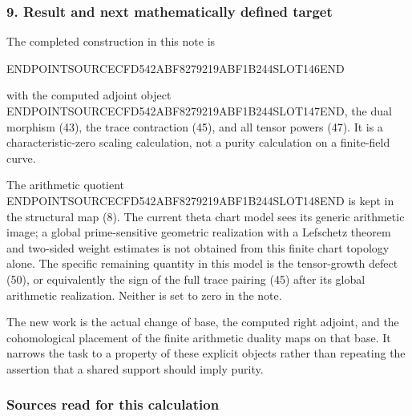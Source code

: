 \subsubsection{9. Result and next mathematically defined target}\label{endpoint-tau_base--result-and-next-mathematically-defined-target}

The completed construction in this note is

ENDPOINTSOURCECFD542ABF8279219ABF1B244SLOT146END

with the computed adjoint object ENDPOINTSOURCECFD542ABF8279219ABF1B244SLOT147END, the dual morphism (43), the trace contraction (45), and all tensor powers (47). It is a characteristic-zero scaling calculation, not a purity calculation on a finite-field curve.

The arithmetic quotient ENDPOINTSOURCECFD542ABF8279219ABF1B244SLOT148END is kept in the structural map (8). The current theta chart model sees its generic arithmetic image; a global prime-sensitive geometric realization with a Lefschetz theorem and two-sided weight estimates is not obtained from this finite chart topology alone. The specific remaining quantity in this model is the tensor-growth defect (50), or equivalently the sign of the full trace pairing (45) after its global arithmetic realization. Neither is set to zero in the note.

The new work is the actual change of base, the computed right adjoint, and the cohomological placement of the finite arithmetic duality maps on that base. It narrows the task to a property of these explicit objects rather than repeating the assertion that a shared support should imply purity.

\subsubsection{Sources read for this calculation}\label{endpoint-tau_base--sources-read-for-this-calculation}

